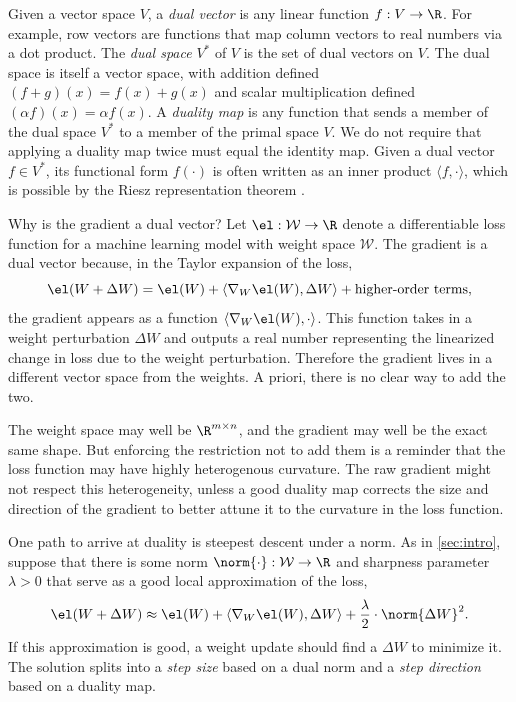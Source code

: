 \begin{definitionbox}
    Given a vector space $V$, a \textit{dual vector} is any linear function $f : V \to \R$. For example, row vectors are functions that map column vectors to real numbers via a dot product. The \textit{dual space} $V^\ast$ of $V$ is the set of dual vectors on $V$. The dual space is itself a vector space, with addition defined $(f + g)(x) = f(x) + g(x)$ and scalar multiplication defined $(\alpha f)(x) = \alpha f(x)$. A \textit{duality map} is any function that sends a member of the dual space $V^\ast$ to a member of the primal space $V$. We do not require that applying a duality map twice must equal the identity map. Given a dual vector $f \in V^\ast$, its functional form $f(\cdot)$ is often written as an inner product $\langle f, \cdot \rangle$, which is possible by the Riesz representation theorem \citep{Riesz1907}.
\end{definitionbox}

Why is the gradient a dual vector? Let $\el : \mathcal{W} \to \R$ denote a differentiable loss function for a machine learning model with weight space $\mathcal{W}$. The gradient is a dual vector because, in the Taylor expansion of the loss, \begin{equation}\label{eq:taylor}
    \el(W+\Delta W) = \el(W) + \langle \nabla_W\el(W), \Delta W \rangle + \text{higher-order terms},
\end{equation}
the gradient appears as a function $\langle \nabla_W \el(W), \cdot \rangle$. This function takes in a weight perturbation $\Delta W$ and outputs a real number representing the linearized change in loss due to the weight perturbation. Therefore the gradient lives in a different vector space from the weights. A priori, there is no clear way to add the two.

The weight space may well be $\R^{m \times n}$, and the gradient may well be the exact same shape. But enforcing the restriction not to add them is a reminder that the loss function may have highly heterogenous curvature. The raw gradient might not respect this heterogeneity, unless a good duality map corrects the size and direction of the gradient to better attune it to the curvature in the loss function.

One path to arrive at duality is steepest descent under a norm. As in \cref{sec:intro}, suppose that there is some norm $\norm{\cdot} : \mathcal{W} \to \R$ and sharpness parameter $\lambda > 0$ that serve as a good local approximation of the loss, \begin{equation}
    \el(W+\Delta W) \approx \el(W) + \langle \nabla_W\el(W), \Delta W \rangle + \frac{\lambda}{2} \cdot \norm{\Delta W}^2.
\end{equation} If this approximation is good, a weight update should find a $\Delta W$ to minimize it. The solution splits into a \textit{step size} based on a dual norm and a \textit{step direction} based on a duality map.

